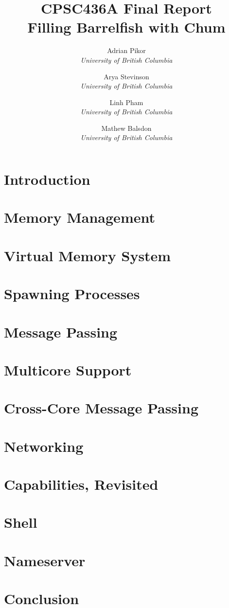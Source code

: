 \documentclass[12pt,a4paper]{article}
\title
{
    \textbf{CPSC436A Final Report}
    \\
    \large{\textbf{Filling Barrelfish with Chum}}
}
\author
{
    {\rm Adrian Pikor}\\\textit{University of British Columbia}
    \and
    {\rm Arya Stevinson}\\\textit{University of British Columbia}
    \and
    {\rm Linh Pham}\\\textit{University of British Columbia}
    \and
    {\rm Mathew Balsdon}\\\textit{University of British Columbia}
}
\begin{document}
\captionsetup[figure]{skip=0pt}
\maketitle
\newpage

\tableofcontents
\newpage

\section{Introduction}

\newpage

\section{Memory Management}

\newpage

\section{Virtual Memory System}\label{M2}

\newpage

\section{Spawning Processes}

\newpage

\section{Message Passing}

\newpage

\section{Multicore Support}

\newpage

\section{Cross-Core Message Passing}

\newpage

\section{Networking}

\newpage

\section{Capabilities, Revisited}

\newpage

\section{Shell}

\newpage

\section{Nameserver}

\newpage

\section{Conclusion}

\newpage



\end{document}
